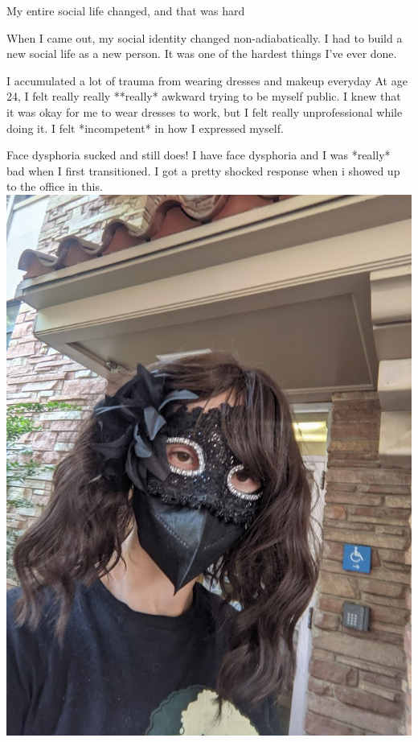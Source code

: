 \begin{frame}{My entire social life changed, and that was hard}

When I came out, my social identity changed non-adiabatically. I had to build a new social life as a new person. It was one of the hardest things I've ever done.
\end{frame}


\begin{frame}{I accumulated a lot of trauma from wearing dresses and makeup everyday}
At age 24, I felt really really **really* awkward trying to be myself public. I knew that it was okay for me to wear dresses to work, but I felt really unprofessional while doing it. I felt *incompetent* in how I expressed myself.
\end{frame}

\begin{frame}{Face dysphoria sucked and still does!}
I have face dysphoria and I was *really* bad when I first transitioned. I got a pretty shocked response when i showed up to the office in this. 
\includegraphics{mae_pics/mae_mask.jpg}

\end{frame}
